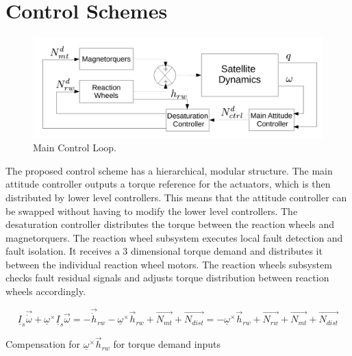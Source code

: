\chapter{Control Schemes}

\begin{figure}[h!]
	\centering 
	\includegraphics[width=170mm]{figures/mainLoop.pdf}	
	\caption{Main Control Loop.}
	\label{label{fig:mainLoop}}
\end{figure}

The proposed control scheme has a hierarchical, modular structure. The main attitude controller outputs a torque reference for the actuators, which is then distributed by lower level controllers. This means that the attitude controller can be swapped without having to modify the lower level controllers. The desaturation controller distributes the torque between the reaction wheels and magnetorquers. The reaction wheel subsystem executes local fault detection and fault isolation. It receives a 3 dimensional torque demand and distributes it between the individual reaction wheel motors. The reaction wheels subsystem checks fault residual signals and adjusts torque distribution between reaction wheels accordingly. 


		\begin{equation}
		\underline{I}_{s}\vec{\dot{\omega}} + \underline{\omega}^\times\underline{I}_{s}\vec{\omega} = -\vec{\dot{h}}_{rw} -  \underline{\omega}^\times \vec{{h}}_{rw} + \vec{N_{mt}}  + \vec{N_{dist}} =  -  \underline{\omega}^\times \vec{{h}}_{rw} + \vec{N_{rw}} + \vec{N_{mt}}  + \vec{N_{dist}} 
		\end{equation}
		
		Compensation for $\underline{\omega}^\times \vec{{h}}_{rw}$ for torque demand inputs  




